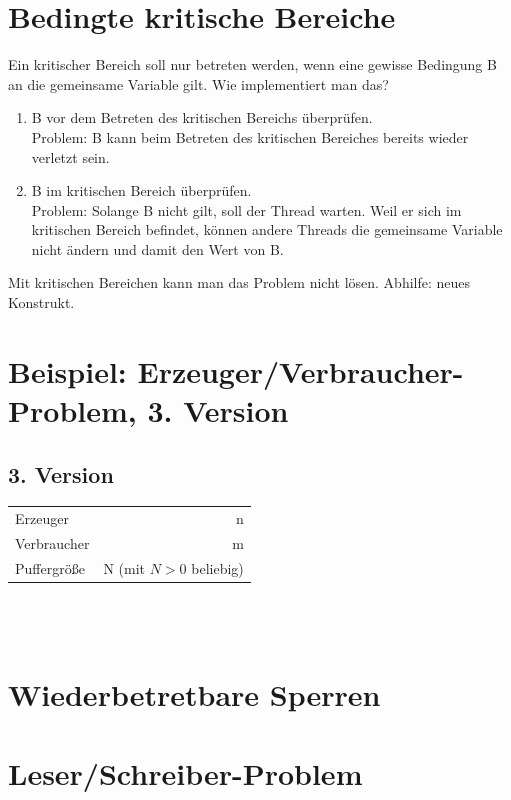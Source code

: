 \section{Bedingte kritische Bereiche}
Ein kritischer Bereich soll nur betreten werden, wenn eine gewisse Bedingung B an die gemeinsame Variable gilt. Wie implementiert man das?
\begin{enumerate}
	\item B vor dem Betreten des kritischen Bereichs überprüfen.\\Problem: B kann beim Betreten des kritischen Bereiches bereits wieder verletzt sein.
	\item B im kritischen Bereich überprüfen.\\Problem: Solange B nicht gilt, soll der Thread warten. Weil er sich im kritischen Bereich befindet, können andere Threads die gemeinsame Variable nicht ändern und damit den Wert von B.
\end{enumerate}
Mit kritischen Bereichen kann man das Problem nicht lösen. Abhilfe: neues Konstrukt.

\section[Beispiel: Erzeuger/Verbraucher (3)]{Beispiel: Erzeuger/Verbraucher-Problem, 3. Version}

\subsection*{3. Version}
\begin{tabular}{l r}
	Erzeuger & n\\
	Verbraucher & m\\
	Puffergröße & N (mit $N > 0$ beliebig)
\end{tabular}\\
\\

\section{Wiederbetretbare Sperren}

\section{Leser/Schreiber-Problem}